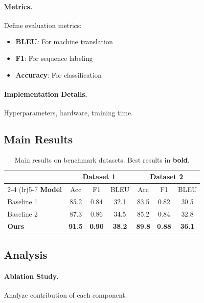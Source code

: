\documentclass[11pt]{article}
\begin{document}
\paragraph{Metrics.} Define evaluation metrics:
\begin{itemize}
    \item \textbf{BLEU}: For machine translation
    \item \textbf{F1}: For sequence labeling
    \item \textbf{Accuracy}: For classification
\end{itemize}

\paragraph{Implementation Details.} Hyperparameters, hardware, training time.

\subsection{Main Results}

\begin{table}[t]
    \centering
    \caption{Main results on benchmark datasets. Best results in \textbf{bold}.}
    \label{tab:main_results}
    \begin{tabular}{lcccccc}
        \toprule
        & \multicolumn{3}{c}{\textbf{Dataset 1}} & \multicolumn{3}{c}{\textbf{Dataset 2}} \\
        \cmidrule(lr){2-4} \cmidrule(lr){5-7}
        \textbf{Model} & Acc & F1 & BLEU & Acc & F1 & BLEU \\
        \midrule
        Baseline 1 & 85.2 & 0.84 & 32.1 & 83.5 & 0.82 & 30.5 \\
        Baseline 2 & 87.3 & 0.86 & 34.5 & 85.2 & 0.84 & 32.8 \\
        \textbf{Ours} & \textbf{91.5} & \textbf{0.90} & \textbf{38.2} & \textbf{89.8} & \textbf{0.88} & \textbf{36.1} \\
        \bottomrule
    \end{tabular}
\end{table}

\subsection{Analysis}

\paragraph{Ablation Study.} Analyze contribution of each component.
\end{document}
